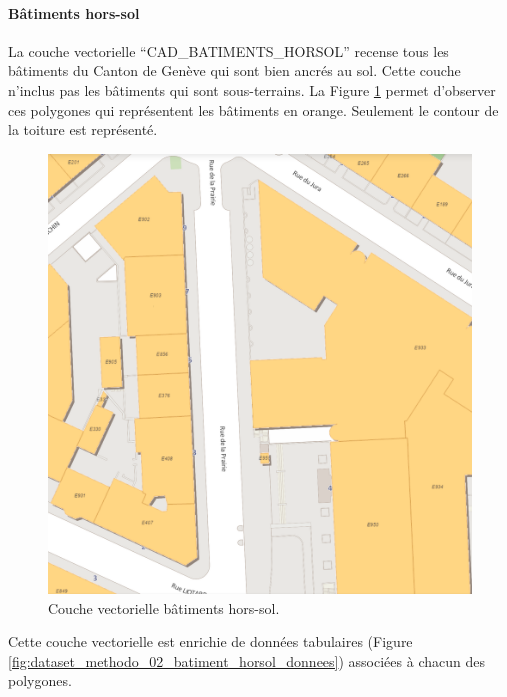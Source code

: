 \paragraph{Bâtiments hors-sol}
La couche vectorielle ``CAD\_BATIMENTS\_HORSOL'' recense tous les bâtiments du Canton de Genève qui sont bien ancrés au sol. Cette couche n'inclus pas les bâtiments qui sont sous-terrains. La Figure \ref{fig:dataset_methodo_01_batiment_horsol} permet d'observer ces polygones qui représentent les bâtiments en orange. Seulement le contour de la toiture est représenté.
\begin{figure}[H]
    \centering
    \includegraphics[width=1\linewidth]{02-main//figures/dataset_methodo_01_batiment_horsol.png}
    \caption{Couche vectorielle bâtiments hors-sol.}
    \label{fig:dataset_methodo_01_batiment_horsol}
\end{figure}
Cette couche vectorielle est enrichie de données tabulaires (Figure \ref{fig:dataset_methodo_02_batiment_horsol_donnees}) associées à chacun des polygones.
